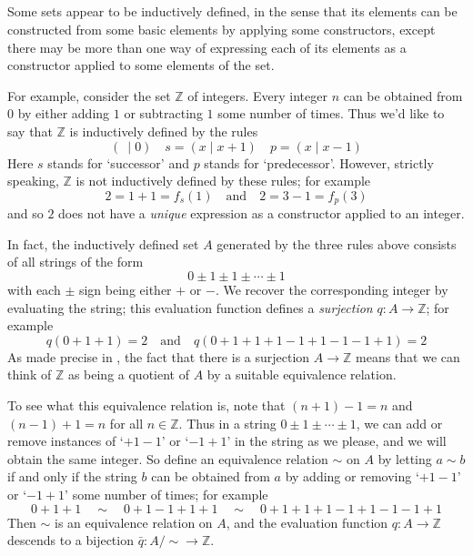 \subsection*{}

Some sets appear to be inductively defined, in the sense that its elements can be constructed from some basic elements by applying some constructors, except there may be more than one way of expressing each of its elements as a constructor applied to some elements of the set.

For example, consider the set $\mathbb{Z}$ of integers. Every integer $n$ can be obtained from $0$ by either adding $1$ or subtracting $1$ some number of times. Thus we'd like to say that $\mathbb{Z}$ is inductively defined by the rules
\[ (~ \mid 0) \quad s = (x \mid x+1) \quad p = (x \mid x-1) \]
Here $s$ stands for `successor' and $p$ stands for `predecessor'. However, strictly 	speaking, $\mathbb{Z}$ is not inductively defined by these rules; for example
\[ 2 = 1 + 1 = f_s(1) \quad \text{and} \quad 2 = 3 - 1 = f_p(3) \]
and so $2$ does not have a \textit{unique} expression as a constructor applied to an integer.

In fact, the inductively defined set $A$ generated by the three rules above consists of all strings of the form
\[ 0 \pm 1 \pm 1 \pm \cdots \pm 1 \]
with each $\pm$ sign being either $+$ or $-$. We recover the corresponding integer by evaluating the string; this evaluation function defines a \textit{surjection} $q : A \to \mathbb{Z}$; for example
\[ q(0+1+1) = 2 \quad \text{and} \quad q(0+1+1+1-1+1-1-1+1) = 2 \]
As made precise in , the fact that there is a surjection $A \to \mathbb{Z}$ means that we can think of $\mathbb{Z}$ as being a quotient of $A$ by a suitable equivalence relation.

To see what this equivalence relation is, note that $(n+1)-1 = n$ and $(n-1)+1=n$ for all $n \in \mathbb{Z}$. Thus in a string $0 \pm 1 \pm \cdots \pm 1$, we can add or remove instances of `$+1-1$' or `$-1+1$' in the string as we please, and we will obtain the same integer. So define an equivalence relation $\sim$ on $A$ by letting $a \sim b$ if and only if the string $b$ can be obtained from $a$ by adding or removing `$+1-1$' or `$-1+1$' some number of times; for example
\[ 0+1+1 \quad \sim \quad 0+1-1+1+1 \quad \sim \quad 0+1+1+1-1+1-1-1+1 \]
Then $\sim$ is an equivalence relation on $A$, and the evaluation function $q : A \to \mathbb{Z}$ descends to a bijection $\bar q : A/{\sim} \to \mathbb{Z}$.

